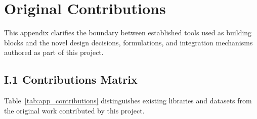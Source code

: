 \documentclass[12pt,a4paper]{report}
\begin{document}
\chapter{Original Contributions}
\label{app:contributions}

This appendix clarifies the boundary between established tools used as building blocks and the novel design decisions, formulations, and integration mechanisms authored as part of this project.

\section*{I.1 Contributions Matrix}

Table~\ref{tab:app_contributions} distinguishes existing libraries and datasets from the original work contributed by this project.
\end{document}
